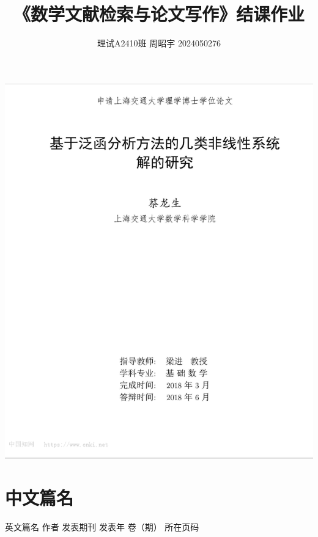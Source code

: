 \documentclass[12pt]{ctexart}
\begin{document}
\title{《数学文献检索与论文写作》结课作业}
\author{理试A2410班 周昭宇 2024050276}
\date{}
\maketitle

\pagebreak
\begin{center}
    \includegraphics[width=\linewidth]{firstPage.png}
\end{center}

\section*{中文篇名}
英文篇名
作者
发表期刊
发表年
卷（期）
所在页码
\end{document}
